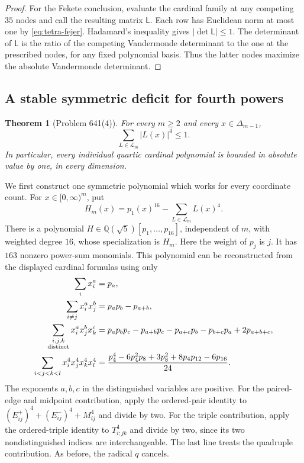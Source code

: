 \documentclass[11pt,a4paper]{article}
\newtheorem{theorem}{Theorem}[section]
\theoremstyle{definition}
\theoremstyle{remark}
\numberwithin{equation}{section}
\begin{document}
\begin{proof}
For the Fekete conclusion, evaluate the cardinal family at any competing
$35$ nodes and call the resulting matrix $\mathsf L$.  Each row has
Euclidean norm at most one by \eqref{eq:tetra-fejer}.  Hadamard's
inequality gives $|\det\mathsf L|\le1$.  The determinant of
$\mathsf L$ is the ratio of the competing Vandermonde determinant to
the one at the prescribed nodes, for any fixed polynomial basis.
Thus the latter nodes maximize the absolute Vandermonde determinant.
\end{proof}

\subsection{A stable symmetric deficit for fourth powers}

\begin{theorem}[Problem 641(4)]\label{thm:simplex-fourth}
For every $m\ge2$ and every $x\in\Delta_{m-1}$,
\begin{equation}\label{eq:simplex-fourth}
 \sum_{L\in\mathcal L_m}|L(x)|^4\le1.
\end{equation}
In particular, every individual quartic cardinal polynomial is bounded
in absolute value by one, in every dimension.
\end{theorem}

We first construct one symmetric polynomial which works for every
coordinate count.  For $x\in[0,\infty)^m$, put
\[
 H_m(x)=p_1(x)^{16}-\sum_{L\in\mathcal L_m}L(x)^4.
\]
There is a polynomial
$H\in\mathbb Q(\sqrt5)[p_1,\ldots,p_{16}]$, independent of $m$,
with weighted degree $16$, whose specialization is $H_m$.
Here the weight of $p_j$ is $j$.
It has $163$ nonzero power-sum monomials.  This polynomial can be
reconstructed from the displayed cardinal formulas using only
\begin{align}
 \sum_i x_i^a={}&p_a,\notag\\
 \sum_{i\ne j}x_i^ax_j^b={}&p_ap_b-p_{a+b},\notag\\
 \sum_{\substack{i,j,k\\\text{distinct}}}x_i^ax_j^bx_k^c
 ={}&p_ap_bp_c-p_{a+b}p_c-p_{a+c}p_b-p_{b+c}p_a
       +2p_{a+b+c},\label{eq:stable-sums}\\
 \sum_{i<j<k<l}x_i^4x_j^4x_k^4x_l^4
 ={}&\frac{p_4^4-6p_4^2p_8+3p_8^2+8p_4p_{12}-6p_{16}}{24}.
       \notag
\end{align}
The exponents $a,b,c$ in the distinguished variables are positive.
For the paired-edge and midpoint contribution, apply the ordered-pair
identity to $(E_{ij}^{+})^4+(E_{ij}^{-})^4+M_{ij}^4$ and divide by
two.  For the triple contribution, apply the ordered-triple identity to
$T_{i;jk}^4$ and divide by two, since its two nondistinguished indices
are interchangeable.  The last line treats the quadruple contribution.
As before, the radical $q$ cancels.
\end{document}
